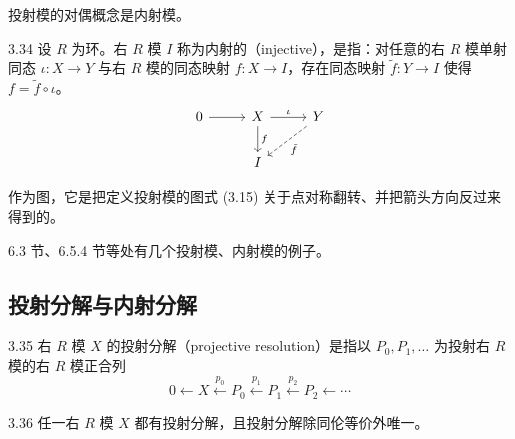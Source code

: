 投射模的对偶概念是内射模。

\begin{definition}{3.34}
设 $R$ 为环。右 $R$ 模 $I$ 称为内射的（injective），是指：对任意的右 $R$ 模单射同态 $\iota\colon X\to Y$ 与右 $R$ 模的同态映射 $f\colon X\to I$，存在同态映射 $\tilde f\colon Y\to I$ 使得 $f=\tilde f\circ\iota$。
\begin{equation*}
\begin{tikzcd}[row sep=1.9em, column sep=2.6em]
0 \arrow[r] & X \arrow[r,"\iota"] \arrow[d,"f"] & Y \arrow[dl,dashed,"\tilde f"] \\
& I &
\end{tikzcd}
\end{equation*}
\end{definition}


作为图，它是把定义投射模的图式 (3.15) 关于点对称翻转、并把箭头方向反过来得到的。


6.3 节、6.5.4 节等处有几个投射模、内射模的例子。

\subsection{投射分解与内射分解}

\begin{definition}{3.35}
右 $R$ 模 $X$ 的投射分解（projective resolution）是指以 $P_0,P_1,\ldots$ 为投射右 $R$ 模的右 $R$ 模正合列
\[
0\leftarrow X\xleftarrow{p_0}P_0\xleftarrow{p_1}P_1\xleftarrow{p_2}P_2\leftarrow\cdots
\]
\end{definition}

\begin{proposition}{3.36}
任一右 $R$ 模 $X$ 都有投射分解，且投射分解除同伦等价外唯一。
\end{proposition}


